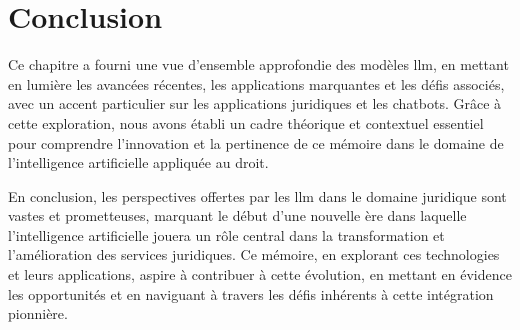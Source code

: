 \section{Conclusion}

Ce chapitre a fourni une vue d'ensemble approfondie des modèles \ac{llm}, en mettant en lumière les avancées récentes, les applications marquantes et les défis associés, avec un accent particulier sur les applications juridiques et les chatbots. Grâce à cette exploration, nous avons établi un cadre théorique et contextuel essentiel pour comprendre l'innovation et la pertinence de ce mémoire dans le domaine de l'intelligence artificielle appliquée au droit. 

En conclusion, les perspectives offertes par les \ac{llm} dans le domaine juridique sont vastes et prometteuses, marquant le début d'une nouvelle ère dans laquelle l'intelligence artificielle jouera un rôle central dans la transformation et l'amélioration des services juridiques. Ce mémoire, en explorant ces technologies et leurs applications, aspire à contribuer à cette évolution, en mettant en évidence les opportunités et en naviguant à travers les défis inhérents à cette intégration pionnière.